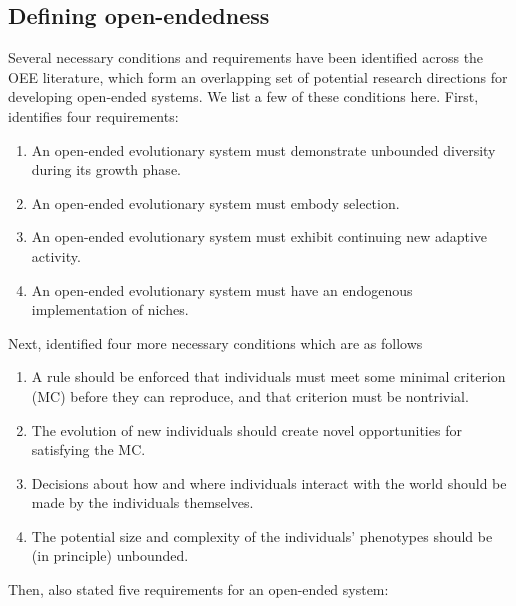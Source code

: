 \subsection{Defining open-endedness}

Several necessary conditions and requirements have been identified across the
\ac{OEE} literature, which form an overlapping set of potential research
directions for developing open-ended systems. We list a few of these conditions
here. First, \textcite{maleyFourStepsOpenended1999} identifies four requirements:

\begin{enumerate}
  \item An open-ended evolutionary system must demonstrate unbounded diversity
        during its growth phase.
  \item An open-ended evolutionary system must embody selection.
  \item An open-ended evolutionary system must exhibit continuing new adaptive
        activity.
  \item An open-ended evolutionary system must have an endogenous implementation
        of niches.
\end{enumerate}
Next, \textcite{sorosIdentifyingNecessaryConditions2014} identified four more necessary
conditions which are as follows

\begin{enumerate}
  \item A rule should be enforced that individuals must meet some minimal
        criterion (MC) before they can reproduce, and that criterion must be
        nontrivial.
  \item The evolution of new individuals should create novel opportunities for
        satisfying the MC.
  \item Decisions about how and where individuals interact with the world should
        be made by the individuals themselves.
  \item The potential size and complexity of the individuals' phenotypes should
        be (in principle) unbounded.
\end{enumerate}
Then, \textcite{taylorRequirementsOpenEndedEvolution2015} also stated five
requirements for an open-ended system:

